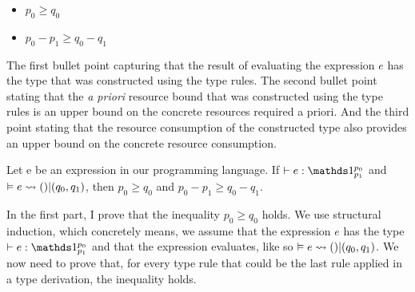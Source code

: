 \begin{itemize}
   \item \(p_0 \geq q_0\)     
   \item \(p_0 - p_1 \geq q_0 - q_1\)
\end{itemize}

The first bullet point capturing that the result of evaluating the expression \(e\) has the type that was constructed using the type rules. The second bullet point stating that the \emph{a priori} resource bound that was constructed using the type rules is an upper bound on the concrete resources required a priori. And the third point stating that the resource consumption of the constructed type also provides an upper bound on the concrete resource consumption.

\begin{theorem}
   Let e be an expression in our programming language. If \(\vdash e : \unit^{p_0}_{p_1}\) and \(\vDash e \rightsquigarrow  () | (q_0, q_1) \), then \(p_0 \geq q_0\) and \(p_0 - p_1 \geq q_0 - q_1\).
\end{theorem}

In the first part, I prove that the inequality \(p_0 \geq q_0\) holds. We use structural induction, which concretely means, we assume that the expression \(e\) has the type \(\vdash e : \unit^{p_0}_{p_1}\) and that the expression evaluates, like so \(\vDash e \rightsquigarrow () | (q_0, q_1)\). We now need to prove that, for every type rule that could be the last rule applied in a type derivation, the inequality holds.


